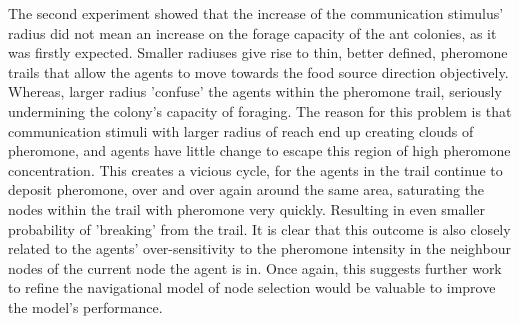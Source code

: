 The second experiment showed that the increase of the communication stimulus' radius did not mean an increase on the forage capacity of the ant colonies, as it was firstly expected. Smaller radiuses give rise to thin, better defined, pheromone trails that allow the agents to move towards the food source direction objectively. Whereas, larger radius 'confuse' the agents within the pheromone trail, seriously undermining the colony's capacity of foraging. The reason for this problem is that communication stimuli with larger radius of reach end up creating clouds of pheromone, and agents have little change to escape this region of high pheromone concentration. This creates a vicious cycle, for the agents in the trail continue to deposit pheromone, over and over again around the same area, saturating the nodes within the trail with pheromone very quickly. Resulting in even smaller probability of 'breaking' from the trail. It is clear that this outcome is also closely related to the agents' over-sensitivity to the pheromone intensity in the neighbour nodes of the current node the agent is in. Once again, this suggests further work to refine the navigational model of node selection would be valuable to improve the model's performance.